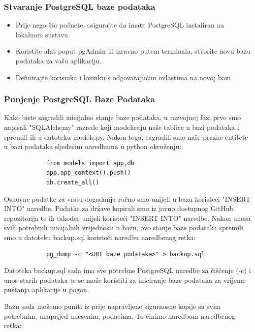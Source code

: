 			\subsubsection{Stvaranje PostgreSQL baze podataka}
			
			\begin{itemize}
					\item Prije nego što počnete, osigurajte da imate PostgreSQL instaliran na lokalnom sustavu.
					\item Koristite alat poput pgAdmin ili izravno putem terminala, stvorite novu bazu podataka za vašu aplikaciju.
					\item Definirajte korisnika i lozinku s odgovarajućim ovlastima na novoj bazi.
			\end{itemize}
			
			\subsubsection{Punjenje PostgreSQL Baze Podataka}
			
			Kako biste sagradili inicijalno stanje baze podataka, u razvojnoj fazi prvo smo napisali "SQLAlchemy" razrede koji modeliraju naše tablice u bazi podataka i spremili ih u datoteku models.py. Nakon toga, sagradili smo naše prazne entitete u bazi podataka sljedećim naredbama u python okruženju:
			
			\begin{verbatim}
			from models import app,db
			app.app_context().push()
			db.create_all()
			\end{verbatim}
			
			Osnovne podatke za vrstu događanja ručno smo unijeli u bazu koristeći "INSERT INTO" naredbe. Podatke za države kopirali smo iz javno dostupnog GitHub repozitorija te ih također unijeli koristeći "INSERT INTO" naredbe. Nakon unosa svih potrebnih inicijalnih vrijednosti u bazu, ovo stanje baze podataka spremili smo u datoteku backup.sql koristeći naredbu naredbenog retka:
			
			\begin{verbatim}
			pg_dump -c "<URI baze podataka>" > backup.sql
			\end{verbatim}
			
			Datoteka backup.sql sada ima sve potrebne PostgreSQL naredbe za čišćenje (-c) i unos starih podataka te se može koristiti za iniciranje baze podataka za vrijeme puštanja aplikacije u pogon.
			
			Bazu sada možemo puniti iz prije napravljene sigurnosne kopije sa svim potrebnim, unaprijed unesenim, podacima. To činimo naredbom naredbenog retka:
			
